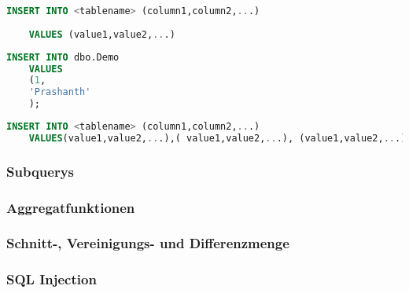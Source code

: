 \vspace{1em}

\begin{lstlisting}[language=SQL]
	INSERT INTO <tablename> (column1,column2,...)
	
	VALUES (value1,value2,...)
\end{lstlisting}

\begin{lstlisting}[language=SQL]
	INSERT INTO dbo.Demo
	VALUES
	(1, 
	'Prashanth'
	);
\end{lstlisting}

\begin{lstlisting}[language=SQL]
	INSERT INTO <tablename> (column1,column2,...) 
	VALUES(value1,value2,...),( value1,value2,...), (value1,value2,...)...
\end{lstlisting}



\subsubsection{Subquerys}
\label{sec:Subquery}

\subsubsection{Aggregatfunktionen}
\label{sec:Aggregatfunktionen}

\subsubsection{Schnitt-, Vereinigungs- und Differenzmenge}
\label{sec:SchnittVereinigungsDifferenzmenge}

\subsubsection{SQL Injection}
\label{sec:SQLInjection}

